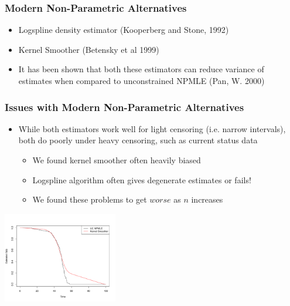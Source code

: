 \documentclass[compress,red]{beamer}
\begin{document}
\begin{frame}

\frametitle{Modern Non-Parametric Alternatives}

	\begin{itemize}
	
	\item Logspline density estimator (Kooperberg and Stone, 1992)
	
	\item Kernel Smoother (Betensky et al 1999)
	
	\item It has been shown that both these estimators can reduce variance of estimates when compared to unconstrained NPMLE (Pan, W. 2000) 
	
	\end{itemize}

\end{frame}

\begin{frame}

\frametitle{Issues with Modern Non-Parametric Alternatives}

	\begin{itemize}
	
	\item While both estimators work well for light censoring (i.e. narrow intervals), both do poorly under heavy censoring, such as current status data
	
		\begin{itemize}
		
		\item We found kernel smoother often heavily biased
		
		\item Logspline algorithm often gives degenerate estimates or fails!
		
		\item We found these problems to get $worse$ as $n$ increases
		
		\end{itemize}
	
	\end{itemize}

\centerline{ \includegraphics[width = 5cm]{KSplot.pdf} }

\end{frame}
\end{document}
